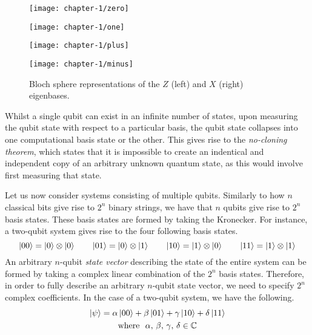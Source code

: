 \begin{figure}[H]
    \centering
    \begin{minipage}{.23\textwidth}
        \centering
        \texttt{[image: chapter-1/zero]}
    \end{minipage}%
    \begin{minipage}{0.23\textwidth}
        \centering
        \texttt{[image: chapter-1/one]}
    \end{minipage}
    \begin{minipage}{0.23\textwidth}
        \centering
        \texttt{[image: chapter-1/plus]}
    \end{minipage}
    \begin{minipage}{0.23\textwidth}
        \centering
        \texttt{[image: chapter-1/minus]}
    \end{minipage}
    \caption{Bloch sphere representations of the $Z$ (left) and $X$ (right) eigenbases.}
\end{figure}

Whilst a single qubit can exist in an infinite number of states, upon measuring the qubit state with respect to a particular basis, the qubit state collapses into one computational basis state or the other. This gives rise to the \textit{no-cloning theorem}, which states that it is impossible to create an indentical and independent copy of an arbitrary unknown quantum state, as this would involve first measuring that state.

Let us now consider systems consisting of multiple qubits. Similarly to how $n$ classical bits give rise to $2^n$ binary strings, we have that $n$ qubits give rise to $2^n$ basis states. These basis states are formed by taking the Kronecker. For instance, a two-qubit system gives rise to the four following basis states.
\begin{equation*}
    \ket{00} = \ket 0 \otimes \ket 0 \qquad
    \ket{01} = \ket 0 \otimes \ket 1 \qquad
    \ket{10} = \ket 1 \otimes \ket 0 \qquad
    \ket{11} = \ket 1 \otimes \ket 1
\end{equation*}
An arbitrary $n$-qubit \textit{state vector} describing the state of the entire system can be formed by taking a complex linear combination of the $2^n$ basis states. Therefore, in order to fully describe an arbitrary $n$-qubit state vector, we need to specify $2^n$ complex coefficients. In the case of a two-qubit system, we have the following.
\begin{gather*}
    \ket\psi =
    \alpha \ket{00} +
    \beta \ket{01} +
    \gamma \ket{10} +
    \delta \ket{11} \\
    \text{where} \,\,\,\, \alpha, \, \beta, \, \gamma, \, \delta \in \mathbb{C}
\end{gather*}


